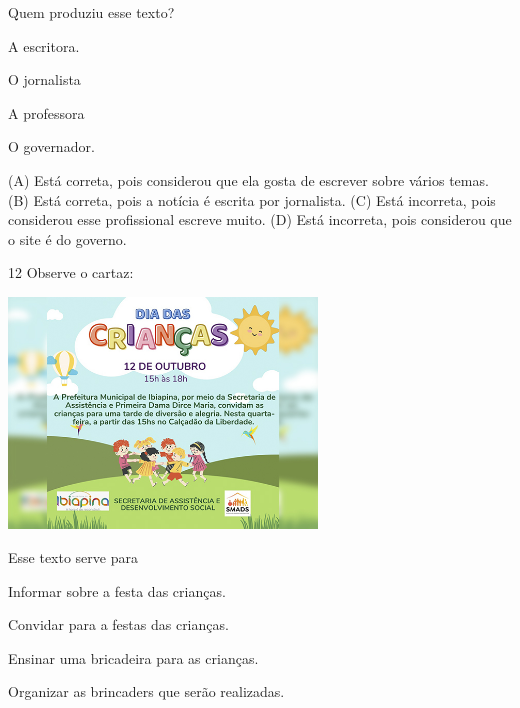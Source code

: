 
Quem produziu esse texto?

\begin{minipage}{.5\textwidth}
\begin{escolha}
\item A escritora.

\item O jornalista

\item A professora

\item O governador.
\end{escolha}
\end{minipage}

(A) Está correta, pois considerou que ela gosta de escrever sobre vários temas.
(B) Está correta, pois a notícia é escrita por jornalista.
(C) Está incorreta, pois considerou esse profissional escreve muito.
(D) Está incorreta, pois considerou que o site é do governo.

\num{12} Observe o cartaz:

\includegraphics[width=3.22436in,height=2.42060in]{media/image181.jpeg}


Esse texto serve para

\begin{escolha}
\item Informar sobre a festa das crianças.

\item Convidar para a festas das crianças.

\item Ensinar uma bricadeira para as crianças.

\item Organizar as brincaders que serão realizadas.
\end{escolha}

